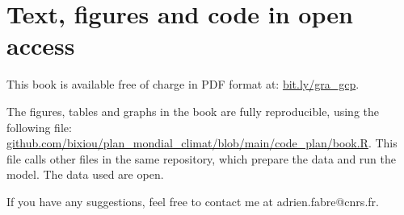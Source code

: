 \documentclass[a5paper,english,openany]{memoir}
\begin{document}
\section{Text, figures and code in open access}

This book is available free of charge in PDF format at: \href{https://global-redistribution-advocates.org/the-global-climate-plan/}{bit.ly/gra\_gcp}. 

The figures, tables and graphs in the book are fully reproducible, using the following file:\\ \href{https://github.com/bixiou/plan_mondial_climat/blob/main/code_plan/book.R}{github.com/bixiou/plan\_mondial\_climat/blob/main/code\_plan/book.R}. This file calls other files in the same repository, which prepare the data and run the model. The data used are open.

If you have any suggestions, feel free to contact me at adrien.fabre@cnrs.fr.

\renewcommand{\url}[1]{\href{#1}{Link}} %
{\small 

}

\clearpage
\end{document}
